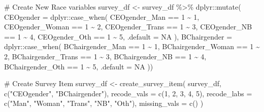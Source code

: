 \documentclass[
  letterpaper,
]{scrbook}
\newenvironment{Shaded}{\begin{snugshade}}{\end{snugshade}}
\newcommand{\AttributeTok}[1]{\textcolor[rgb]{0.40,0.45,0.13}{#1}}
\newcommand{\CommentTok}[1]{\textcolor[rgb]{0.37,0.37,0.37}{#1}}
\newcommand{\ConstantTok}[1]{\textcolor[rgb]{0.56,0.35,0.01}{#1}}
\newcommand{\DecValTok}[1]{\textcolor[rgb]{0.68,0.00,0.00}{#1}}
\newcommand{\FunctionTok}[1]{\textcolor[rgb]{0.28,0.35,0.67}{#1}}
\newcommand{\NormalTok}[1]{\textcolor[rgb]{0.00,0.23,0.31}{#1}}
\newcommand{\OtherTok}[1]{\textcolor[rgb]{0.00,0.23,0.31}{#1}}
\newcommand{\SpecialCharTok}[1]{\textcolor[rgb]{0.37,0.37,0.37}{#1}}
\newcommand{\StringTok}[1]{\textcolor[rgb]{0.13,0.47,0.30}{#1}}
\begin{document}
\begin{Shaded}
\begin{Highlighting}[]
\CommentTok{\# Create New Race variables}
\NormalTok{survey\_df }\OtherTok{\textless{}{-}}\NormalTok{ survey\_df }\SpecialCharTok{\%\textgreater{}\%}
\NormalTok{  dplyr}\SpecialCharTok{::}\FunctionTok{mutate}\NormalTok{(}
    \AttributeTok{CEOgender =}\NormalTok{ dplyr}\SpecialCharTok{::}\FunctionTok{case\_when}\NormalTok{(}
\NormalTok{      CEOgender\_Man }\SpecialCharTok{==} \DecValTok{1} \SpecialCharTok{\textasciitilde{}} \DecValTok{1}\NormalTok{,}
\NormalTok{      CEOgender\_Woman }\SpecialCharTok{==} \DecValTok{1} \SpecialCharTok{\textasciitilde{}} \DecValTok{2}\NormalTok{,}
\NormalTok{      CEOgender\_Trans }\SpecialCharTok{==} \DecValTok{1} \SpecialCharTok{\textasciitilde{}} \DecValTok{3}\NormalTok{,}
\NormalTok{      CEOgender\_NB }\SpecialCharTok{==} \DecValTok{1} \SpecialCharTok{\textasciitilde{}} \DecValTok{4}\NormalTok{,}
\NormalTok{      CEOgender\_Oth }\SpecialCharTok{==} \DecValTok{1} \SpecialCharTok{\textasciitilde{}} \DecValTok{5}\NormalTok{,}
      \AttributeTok{.default =} \ConstantTok{NA}
\NormalTok{    ),}
    \AttributeTok{BChairgender =}\NormalTok{ dplyr}\SpecialCharTok{::}\FunctionTok{case\_when}\NormalTok{(}
\NormalTok{      BChairgender\_Man }\SpecialCharTok{==} \DecValTok{1} \SpecialCharTok{\textasciitilde{}} \DecValTok{1}\NormalTok{,}
\NormalTok{      BChairgender\_Woman }\SpecialCharTok{==} \DecValTok{1} \SpecialCharTok{\textasciitilde{}} \DecValTok{2}\NormalTok{,}
\NormalTok{      BChairgender\_Trans }\SpecialCharTok{==} \DecValTok{1} \SpecialCharTok{\textasciitilde{}} \DecValTok{3}\NormalTok{,}
\NormalTok{      BChairgender\_NB }\SpecialCharTok{==} \DecValTok{1} \SpecialCharTok{\textasciitilde{}} \DecValTok{4}\NormalTok{,}
\NormalTok{      BChairgender\_Oth }\SpecialCharTok{==} \DecValTok{1} \SpecialCharTok{\textasciitilde{}} \DecValTok{5}\NormalTok{,}
      \AttributeTok{.default =} \ConstantTok{NA}
\NormalTok{  ))}

\CommentTok{\# Create Survey Item}
\NormalTok{survey\_df }\OtherTok{\textless{}{-}} \FunctionTok{create\_survey\_item}\NormalTok{(}
\NormalTok{  survey\_df, }
  \FunctionTok{c}\NormalTok{(}\StringTok{"CEOgender"}\NormalTok{, }\StringTok{"BChairgender"}\NormalTok{), }
  \AttributeTok{recode\_vals =} \FunctionTok{c}\NormalTok{(}\DecValTok{1}\NormalTok{, }\DecValTok{2}\NormalTok{, }\DecValTok{3}\NormalTok{, }\DecValTok{4}\NormalTok{, }\DecValTok{5}\NormalTok{), }
  \AttributeTok{recode\_labs =} \FunctionTok{c}\NormalTok{(}\StringTok{"Man"}\NormalTok{, }\StringTok{"Woman"}\NormalTok{, }\StringTok{"Trans"}\NormalTok{, }\StringTok{"NB"}\NormalTok{, }\StringTok{"Oth"}\NormalTok{), }
  \AttributeTok{missing\_vals =} \FunctionTok{c}\NormalTok{()}
\NormalTok{)}
\end{Highlighting}
\end{Shaded}
\end{document}
